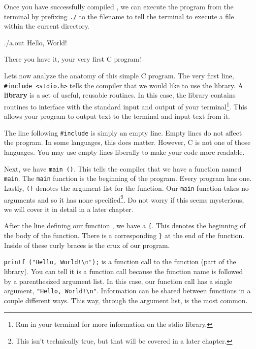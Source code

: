 Once you have successfully compiled , we can execute the program
from the terminal by prefixing \verb|./| to the filename to tell the terminal
to execute a file within the current directory.

\begin{Terminal}
./a.out
Hello, World!
\end{Terminal}

There you have it, your very first C program!

Lets now analyze the anatomy of this simple C program. The very first line,
\verb|#include <stdio.h>| tells the compiler that we would like to use the
 library. A \textbf{library} is a set of useful, reusable
routines. In this case, the  library contains routines to
interface with the standard input and output of your terminal\footnote{Run
 \rmfamily in your terminal for more information on the
stdio library.}.  This allows your program to output text to the terminal and
input text from it.

The line following \verb|#include| is simply an empty line. Empty lines do
not affect the program. In some languages, this does matter. However, C is not
one of those languages. You may use empty lines liberally to make your code
more readable.

Next, we have \verb|main ()|. This tells the compiler that we have a function
named \verb|main|. The \verb|main| function is the beginning of the program.
Every program has one. Lastly, \verb|()| denotes the argument list for the
function. Our \verb|main| function takes no arguments and so it has none
specified\footnote{This isn't technically true, but that will be covered in a
later chapter.}. Do not worry if this seems mysterious, we will cover it
in detail in a later chapter.

After the line defining our function , we have a \verb|{|. This
denotes the beginning of the body of the function. There is a corresponding
\verb|}| at the end of the function. Inside of these curly braces is the crux
of our program.

\verb|printf ("Hello, World!\n");| is a function call to the 
function (part of the  library). You can tell it is a function
call because the function name is followed by a parenthesized argument list.
In this case, our function call has a single argument,
\verb|"Hello, World!\n"|. Information can be shared between functions in
a couple different ways. This way, through the argument list, is the most
common.

